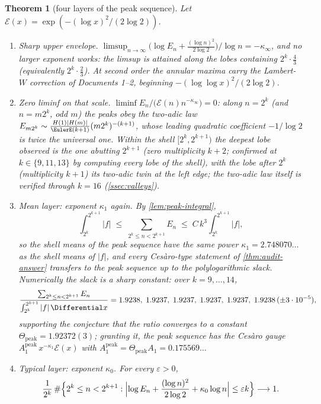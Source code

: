 \documentclass[11pt,oneside]{article}
\newtheorem{theorem}{Theorem}[section]
\theoremstyle{definition}
\theoremstyle{remark}
\begin{document}
\begin{theorem}[four layers of the peak sequence]
\label{thm:peak-layers}
Let $\mathcal E(x)=\exp(-(\log x)^2/(2\log2))$.
\begin{enumerate}
\item \emph{Sharp upper envelope.}
$\limsup_{n\to\infty}\bigl(\log E_n+\tfrac{(\log n)^2}{2\log2}\bigr)/\log
n=-\kappa_\infty$, and no larger exponent works: the limsup is attained
along the lobes containing $2^k\cdot\tfrac43$ (equivalently
$2^k\cdot\tfrac23$).  At second order the annular maxima carry the
Lambert-$W$ correction of Documents 1--2, beginning
$-(\log\log x)^2/(2\log2)$.
\item \emph{Zero liminf on that scale.}
$\liminf E_n/\bigl(\mathcal E(n)n^{-\kappa_\infty}\bigr)=0$: along
$n=2^k$ (and $n=m2^k$, odd $m$) the peaks obey the two-adic law
$E_{m2^k}\sim\frac{H(1)|H(m)|}{\EulerE(k+1)}(m2^k)^{-(k+1)}$, whose leading
quadratic coefficient $-1/\log2$ is twice the universal one.  Within the
shell $[2^k,2^{k+1})$ the deepest lobe observed is the one abutting
$2^{k+1}$ (zero multiplicity $k+2$; confirmed at $k\in\{9,11,13\}$ by
computing every lobe of the shell), with the lobe after $2^k$
(multiplicity $k+1$) its two-adic twin at the left edge; the two-adic
law itself is verified through $k=16$ (\cref{ssec:valleys}).
\item \emph{Mean layer: exponent $\kappa_1$ again.}  By
\cref{lem:peak-integral},
\[
 \int_{2^k}^{2^{k+1}}|f|\;\le\;\sum_{2^k\le n<2^{k+1}}E_n
 \;\le\;C\,k^{3}\int_{2^k}^{2^{k+1}}|f|,
\]
so the shell means of the peak sequence have the same power
$\kappa_1=2.748070\ldots$ as the shell means of $|f|$, and every
Ces\`aro-type statement of \cref{thm:audit-answer} transfers to the peak
sequence up to the polylogarithmic slack.  Numerically the slack is a
sharp constant: over $k=9,\dots,14$,
\[
 \frac{\sum_{2^k\le n<2^{k+1}}E_n}{\int_{2^k}^{2^{k+1}}|f|\,\Differential x}
 =1.9238,\;1.9237,\;1.9237,\;1.9237,\;1.9237,\;1.9238\,(\pm3\cdot10^{-5}),
\]
supporting the conjecture that the ratio converges to a constant
$\Theta_{\mathrm{peak}}=1.92372(3)$; granting it, the peak sequence has
the Ces\`aro gauge $A_1^{\mathrm{peak}}\,x^{-\kappa_1}\mathcal E(x)$ with
$A_1^{\mathrm{peak}}=\Theta_{\mathrm{peak}}A_1=0.175569\ldots$
\item \emph{Typical layer: exponent $\kappa_0$.}  For every
$\varepsilon>0$,
\[
 \frac{1}{2^k}\,\#\Bigl\{2^k\le n<2^{k+1}:
 \Bigl|\log E_n+\frac{(\log n)^2}{2\log2}+\kappa_0\log n\Bigr|
 \le\varepsilon k\Bigr\}\longrightarrow1 .
\]
\end{enumerate}
\end{theorem}
\end{document}
